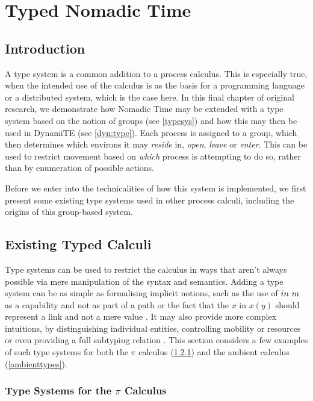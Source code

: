 
\chapter{Typed Nomadic Time}
\label{tnt}

\section{Introduction}

A type system is a common addition to a process calculus.  This is
especially true, when the intended use of the calculus is as the basis
for a programming language or a distributed system, which is the case
here.  In this final chapter of original research, we demonstrate how
Nomadic Time may be extended with a type system based on the notion of
groups (see \ref{typesys}) and how this may then be used in DynamiTE
(see \ref{dyn:type}).  Each process is assigned to a group, which then
determines which environs it may \emph{reside} in, \emph{open},
\emph{leave} or \emph{enter}.  This can be used to restrict movement
based on \emph{which} process is attempting to do so, rather than by
enumeration of possible actions.

Before we enter into the technicalities of how this system is
implemented, we first present some existing type systems used in other
process calculi, including the origins of this group-based system.

\section{Existing Typed Calculi}
\label{typedcalculi}

Type systems can be used to restrict the calculus in ways that aren't
always possible via mere manipulation of the syntax and semantics.
Adding a type system can be as simple as formalising implicit notions,
such as the use of $in\ m$ as a capability and not as part of a
path \cite{ambienttypes} or the fact that the $x$ in $x(y)$ should
represent a link and not a mere value \cite{sangiorgi:types-or}.  It
may also provide more complex intuitions, by distinguishing individual
entities, controlling mobility
\cite{ambienttypes,sangiorgi:mobsafeambients} or resources
\cite{hennessy:dpi98} or even providing a full subtyping relation
\cite{sangiorgi:typing,boxedamb02}.  This section considers a few
examples of such type systems for both the $\pi$ calculus
(\ref{pitypes}) and the ambient calculus
(\ref{ambienttypes}).\subsection{Type Systems for the $\pi$ Calculus}
\label{pitypes}

